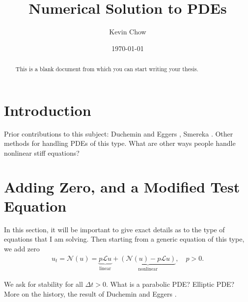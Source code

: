 \documentclass{sfuthesis}
\title{Numerical Solution to PDEs}
\author{Kevin Chow}
\date{\today}
\renewcommand{\L}{\mathcal{L}}
\newcommand{\N}{\mathcal{N}}
\begin{document}
\frontmatter
\maketitle{}
\makecommittee{}

\begin{abstract}
	This is a blank document from which you can start writing your thesis.
\end{abstract}


\begin{dedication} %
\end{dedication}


\begin{acknowledgements} %
\end{acknowledgements}

\tableofcontents\clearpage
{}\listoftables\clearpage
{}\listoffigures





%
%

\mainmatter%

\chapter{Introduction}
Prior contributions to this subject: Duchemin and Eggers \cite{duchemin2014explicit}, Smereka \cite{smereka2003semi}. Other methods for handling PDEs of this type.
What are other ways people handle nonlinear stiff equations? 

\chapter{Adding Zero, and a Modified Test Equation}
In this section, it will be important to give exact details as to the type of equations that I am solving. Then starting from a generic equation of this type, we add zero
\begin{align*}
        u_t = \N(u)
= \underbrace{p\L u}_\text{linear} +\underbrace{ (\N(u) - p\L u)}_\text{nonlinear}, 
\quad 
p > 0.
\end{align*}

We ask for stability for all $\Delta t > 0$. What is a parabolic PDE? Elliptic PDE? More on the history, the result of Duchemin and Eggers \cite{duchemin2014explicit}.
\end{document}
